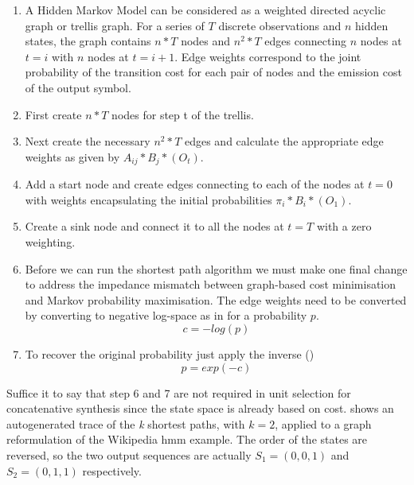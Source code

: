 {{{{{{{{\begin{enumerate}
  \item A Hidden Markov Model can be considered as a weighted directed acyclic graph or trellis graph. For a series of $T$ discrete observations and $n$ hidden states, the graph contains $n*T$ nodes and $n^{2}*T$ edges connecting $n$ nodes at $t=i$ with $n$ nodes at $t=i+1$. Edge weights correspond to the joint probability of the transition cost for each pair of nodes and the emission cost of the output symbol.
  \item First create $n*T$ nodes  for step t of the trellis.
  \item Next create the necessary $n^2*T$ edges and calculate the appropriate edge weights as given by $A_{ij}*B_{j}*(O_{t})$. 
  \item Add a start node and create edges connecting to each of the nodes at $t=0$ with weights encapsulating the initial probabilities $\pi_{i}*B_{i}*(O_{1})$.
  \item Create a sink node and connect it to all the nodes at $t=T$ with a zero weighting.
  \item Before we can run the shortest path algorithm we must make one final change to address the impedance mismatch between graph-based cost minimisation and Markov probability maximisation. The edge weights need to be converted by converting to negative log-space as in   for a probability $p$.
  \begin{equation}
\label{eq:log_cost}
c = -log(p)
\end{equation}
  \item To recover the original probability just apply the inverse ()
\begin{equation}
\label{eq:prob_cost}
p = exp(-c)
\end{equation}
\end{enumerate}

Suffice it to say that step 6 and 7 are not required in unit selection for concatenative synthesis since the state space is already based on cost.  shows an autogenerated trace of the \textit{k} shortest paths, with $k=2$, applied to a graph reformulation of the Wikipedia \acrshort{hmm} example. The order of the states are reversed, so the two output sequences are actually $S_1 = (0, 0, 1)$ and $S_2 = (0, 1, 1)$ respectively.
 
}}}}}}}}
